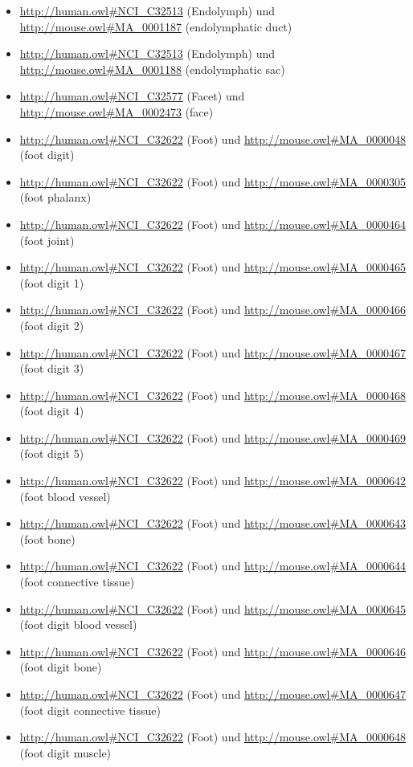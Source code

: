 \begin{itemize}
	\item \url{http://human.owl#NCI_C32513} (Endolymph) und \url{http://mouse.owl#MA_0001187} (endolymphatic duct)
	\item \url{http://human.owl#NCI_C32513} (Endolymph) und \url{http://mouse.owl#MA_0001188} (endolymphatic sac)
	\item \url{http://human.owl#NCI_C32577} (Facet\textunderscoreJoint) und \url{http://mouse.owl#MA_0002473} (face)
	\item \url{http://human.owl#NCI_C32622} (Foot) und \url{http://mouse.owl#MA_0000048} (foot digit)
	\item \url{http://human.owl#NCI_C32622} (Foot) und \url{http://mouse.owl#MA_0000305} (foot phalanx)
	\item \url{http://human.owl#NCI_C32622} (Foot) und \url{http://mouse.owl#MA_0000464} (foot joint)
	\item \url{http://human.owl#NCI_C32622} (Foot) und \url{http://mouse.owl#MA_0000465} (foot digit 1)
	\item \url{http://human.owl#NCI_C32622} (Foot) und \url{http://mouse.owl#MA_0000466} (foot digit 2)
	\item \url{http://human.owl#NCI_C32622} (Foot) und \url{http://mouse.owl#MA_0000467} (foot digit 3)
	\item \url{http://human.owl#NCI_C32622} (Foot) und \url{http://mouse.owl#MA_0000468} (foot digit 4)
	\item \url{http://human.owl#NCI_C32622} (Foot) und \url{http://mouse.owl#MA_0000469} (foot digit 5)
	\item \url{http://human.owl#NCI_C32622} (Foot) und \url{http://mouse.owl#MA_0000642} (foot blood vessel)
	\item \url{http://human.owl#NCI_C32622} (Foot) und \url{http://mouse.owl#MA_0000643} (foot bone)
	\item \url{http://human.owl#NCI_C32622} (Foot) und \url{http://mouse.owl#MA_0000644} (foot connective tissue)
	\item \url{http://human.owl#NCI_C32622} (Foot) und \url{http://mouse.owl#MA_0000645} (foot digit blood vessel)
	\item \url{http://human.owl#NCI_C32622} (Foot) und \url{http://mouse.owl#MA_0000646} (foot digit bone)
	\item \url{http://human.owl#NCI_C32622} (Foot) und \url{http://mouse.owl#MA_0000647} (foot digit connective tissue)
	\item \url{http://human.owl#NCI_C32622} (Foot) und \url{http://mouse.owl#MA_0000648} (foot digit muscle)

\end{itemize}
